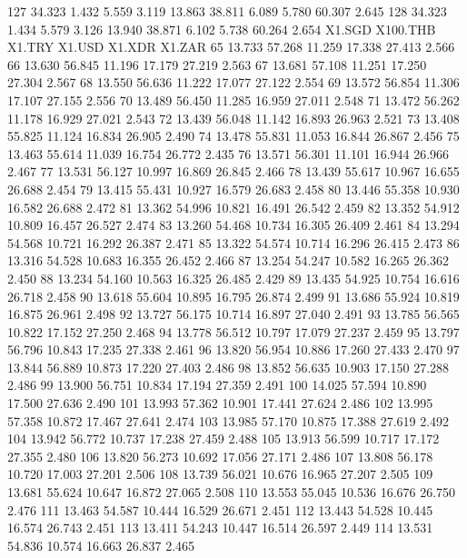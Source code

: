 \documentclass[a4paper,11pt]{scrartcl}
\begin{document}
\begin{Schunk}
\begin{Soutput}
127 34.323  1.432  5.559  3.119 13.863   38.811  6.089  5.780   60.307  2.645
128 34.323  1.434  5.579  3.126 13.940   38.871  6.102  5.738   60.264  2.654
    X1.SGD X100.THB X1.TRY X1.USD X1.XDR X1.ZAR
65  13.733   57.268 11.259 17.338 27.413  2.566
66  13.630   56.845 11.196 17.179 27.219  2.563
67  13.681   57.108 11.251 17.250 27.304  2.567
68  13.550   56.636 11.222 17.077 27.122  2.554
69  13.572   56.854 11.306 17.107 27.155  2.556
70  13.489   56.450 11.285 16.959 27.011  2.548
71  13.472   56.262 11.178 16.929 27.021  2.543
72  13.439   56.048 11.142 16.893 26.963  2.521
73  13.408   55.825 11.124 16.834 26.905  2.490
74  13.478   55.831 11.053 16.844 26.867  2.456
75  13.463   55.614 11.039 16.754 26.772  2.435
76  13.571   56.301 11.101 16.944 26.966  2.467
77  13.531   56.127 10.997 16.869 26.845  2.466
78  13.439   55.617 10.967 16.655 26.688  2.454
79  13.415   55.431 10.927 16.579 26.683  2.458
80  13.446   55.358 10.930 16.582 26.688  2.472
81  13.362   54.996 10.821 16.491 26.542  2.459
82  13.352   54.912 10.809 16.457 26.527  2.474
83  13.260   54.468 10.734 16.305 26.409  2.461
84  13.294   54.568 10.721 16.292 26.387  2.471
85  13.322   54.574 10.714 16.296 26.415  2.473
86  13.316   54.528 10.683 16.355 26.452  2.466
87  13.254   54.247 10.582 16.265 26.362  2.450
88  13.234   54.160 10.563 16.325 26.485  2.429
89  13.435   54.925 10.754 16.616 26.718  2.458
90  13.618   55.604 10.895 16.795 26.874  2.499
91  13.686   55.924 10.819 16.875 26.961  2.498
92  13.727   56.175 10.714 16.897 27.040  2.491
93  13.785   56.565 10.822 17.152 27.250  2.468
94  13.778   56.512 10.797 17.079 27.237  2.459
95  13.797   56.796 10.843 17.235 27.338  2.461
96  13.820   56.954 10.886 17.260 27.433  2.470
97  13.844   56.889 10.873 17.220 27.403  2.486
98  13.852   56.635 10.903 17.150 27.288  2.486
99  13.900   56.751 10.834 17.194 27.359  2.491
100 14.025   57.594 10.890 17.500 27.636  2.490
101 13.993   57.362 10.901 17.441 27.624  2.486
102 13.995   57.358 10.872 17.467 27.641  2.474
103 13.985   57.170 10.875 17.388 27.619  2.492
104 13.942   56.772 10.737 17.238 27.459  2.488
105 13.913   56.599 10.717 17.172 27.355  2.480
106 13.820   56.273 10.692 17.056 27.171  2.486
107 13.808   56.178 10.720 17.003 27.201  2.506
108 13.739   56.021 10.676 16.965 27.207  2.505
109 13.681   55.624 10.647 16.872 27.065  2.508
110 13.553   55.045 10.536 16.676 26.750  2.476
111 13.463   54.587 10.444 16.529 26.671  2.451
112 13.443   54.528 10.445 16.574 26.743  2.451
113 13.411   54.243 10.447 16.514 26.597  2.449
114 13.531   54.836 10.574 16.663 26.837  2.465

\end{Soutput}
\end{Schunk}
\end{document}
